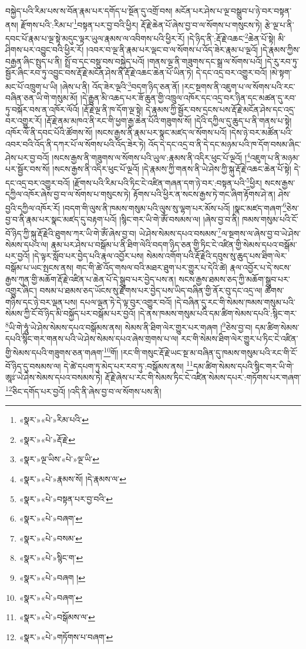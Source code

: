 བསྐྱེད་པའི་རིམ་པས་ས་བོན་རྣམ་པར་དགོད་པ་སྔོན་དུ་འགྲོ་བས། མངོན་པར་ཤེས་པ་ལྔ་བསྒྲུབ་པ་ཉེ་བར་བསྟན་ནས། རྫོགས་པའི་:རིམ་པ་\footnote{«སྣར་»«པེ་»རིམ་པའི་}བསྟན་པར་བྱ་བའི་ཕྱིར། རྡོ་རྗེ་ཆེན་པོ་ཞེས་བྱ་བ་ལ་སོགས་པ་གསུངས་ཏེ། རྩེ་ལྔ་པ་ནི་དབང་པོ་རྣམ་པ་ལྔ་སྟེ་མདུང་ལྟར་ཡུལ་རྣམས་ལ་འབིགས་པའི་ཕྱིར་རོ། །དེ་ཉིད་ནི་:རྡོ་རྗེ་འཆང་\footnote{«སྣར་»«པེ་»རྡོ་རྗེ་}ཆེན་པོ་སྟེ། མི་ཤིགས་པར་འབྱུང་བའི་ཕྱིར་རོ། །འབར་བ་ལྔ་ནི་རྣམ་པར་ལྡང་བ་ལ་སོགས་པ་འོད་ཟེར་རྣམ་པ་ལྔའོ། །དེ་རྣམས་ཀྱིས་བརྒྱན་ཞིང་སྤུད་པ་ནི། སྤྲོ་བ་དང་བསྡུ་བས་བསྐྱེད་པའོ། །གནས་ལྔ་ནི་གཟུགས་དང་སྒྲ་ལ་སོགས་པའོ། །དེ་རུ་རབ་ཏུ་སྦྱོར་ཞིང་རབ་ཏུ་འབྱུང་བས་རྡོ་རྗེ་མངོན་ཤེས་ནི་རྡོ་རྗེ་འཆང་ཆེན་པོ་ཡིན་ཏེ། དེ་དང་འདྲ་བར་འགྱུར་བའོ། །མེ་སྟག་མང་པོ་འཁྲུག་པ་ཡི། །ཞེས་པ་ནི། འོད་ཟེར་ལྔའི་\footnote{«སྣར་»ལྔ་ཡིས་«པེ་»ལྔ་ཡི་}བདག་ཉིད་ཅན་ནོ། །རང་སྔགས་ནི་འཇུག་པ་ལ་སོགས་པའི་རང་བཞིན་ཅན་ཡི་གེ་གསུམ་མོ། །དེ་རྒྱུན་མི་འཆད་པར་ཟོ་ཆུན་གྱི་འཁྲུལ་འཁོར་དང་འདྲ་བར་ཉིན་དང་མཚན་དུ་རབ་ཏུ་བསྐོར་བས་ན་འཁོར་ལོའོ། །རྡོ་རྗེ་ལྔ་ནི་ཁ་དོག་ལྔ་སྟེ། དེ་རྣམས་ཀྱི་སྦྱོར་བས་དྲངས་པས་རྡོ་རྗེ་མངོན་ཤེས་དང་འདྲ་བར་འགྱུར་རོ། །རྡོ་རྗེ་ནམ་མཁའ་ནི་རང་གི་ཕྱག་རྒྱ་ཆེན་པོའི་གཟུགས་སོ། །དེའི་དཀྱིལ་དུ་ཆུད་པ་ནི་གནས་པ་སྟེ། འཁོར་ལོ་ནི་དབང་པོའི་ཚོགས་སོ། །སངས་རྒྱས་ནི་རྣམ་པར་སྣང་མཛད་ལ་སོགས་པའོ། །དེས་ཉེ་བར་མཚོན་པའི་འབར་བའི་འོད་ནི་དཀར་པོ་ལ་སོགས་པའི་འོད་ཟེར་ཏེ། འོད་དེ་དང་འདྲ་བ་ནི་དེ་དང་མཉམ་པའི་ཁ་དོག་བསམ་ཞིང་ཤེས་པར་བྱ་བའོ། །སངས་རྒྱས་ནི་གཟུགས་ལ་སོགས་པའི་ཡུལ་:རྣམས་ནི་འདིར་ཕུང་པོ་ལྔའོ། །\footnote{«སྣར་»«པེ་»རྣམས་སོ། །དེ་རྣམས་ལ་}འཇུག་པ་ནི་མཉམ་པར་སྦྱོར་བས་སོ། །སངས་རྒྱས་ནི་འདིར་ཕུང་པོ་ལྔའོ། །དེ་རྣམས་ཀྱི་གནས་ནི་ཡེ་ཤེས་ཀྱི་སྐུ་རྡོ་རྗེ་འཆང་ཆེན་པོ་སྟེ། དེ་དང་འདྲ་བར་འགྱུར་བའོ། །རྫོགས་པའི་རིམ་པའི་ཏིང་ངེ་འཛིན་གཞན་དག་ཉེ་བར་:བསྟན་པའི་\footnote{«སྣར་»«པེ་»བསྟན་པར་བྱ་བའི་}ཕྱིར། སངས་རྒྱས་དཀྱིལ་འཁོར་ཞེས་བྱ་བ་ལ་སོགས་པ་གསུངས་ཏེ། རྟོགས་པའི་ཕྱིར་ན་སངས་རྒྱས་ཏེ་གང་ཞིག་རྟོགས་ཤེ་ན། ཤེས་བྱའི་དཀྱིལ་འཁོར་རོ། །བདག་གི་ལུས་ནི་ཁམས་གསུམ་པའི་ལུས་སུ་ལྷག་པར་མོས་པའོ། །སྣང་མཛད་གཞག་\footnote{«སྣར་»«པེ་»བཞག་}ཅེས་བྱ་བ་ནི་རྣམ་པར་སྣང་མཛད་དུ་བརྟག་པའོ། །སྙིང་གར་ཡི་གེ་ཨོཾ་བསམས་ལ། །ཞེས་བྱ་བ་ནི། ཁམས་གསུམ་པའི་ངོ་བོ་ཉིད་ཀྱི་སྐུ་རྡོ་རྗེའི་ཐུགས་ཀར་ཡི་གེ་ཨོཾ་ཞེས་བྱ་བ། ཡེ་ཤེས་སེམས་དཔའ་བསམས་\footnote{«སྣར་»«པེ་»བསམ་}ལ་སྔགས་ལ་ཞེས་བྱ་བ་ཡེ་ཤེས་སེམས་དཔའ་ལ། རྣམ་པར་ཤེས་པ་བསྒོམ་པ་ནི་ཐིག་ལེའི་བདག་ཉིད་ཅན་གྱི་ཏིང་ངེ་འཛིན་གྱི་སེམས་དཔའ་བསྒོམ་པར་བྱའོ། །དེ་ལྟར་སློབ་པར་བྱེད་པའི་རྣལ་འབྱོར་པས། སེམས་འགོག་པའི་རྡོ་རྗེའི་དབུས་སུ་ཆུད་པས་ཐིག་ལེར་བསྒོམ་པ་ཡང་སྤངས་ནས། གང་གི་ཚེ་འོད་གསལ་བའི་མཐར་ཐུག་པར་གྱུར་པ་དེའི་ཚེ། རྣལ་འབྱོར་པ་དེ་སངས་རྒྱས་ཀུན་གྱི་མཆོག་རྡོ་རྗེ་འཛིན་པ་ཆེན་པོ་དེ་སྒྲུབ་པར་བྱེད་པས་ན། སངས་རྒྱས་ཐམས་ཅད་ཀྱི་མཆོག་སྒྲུབ་པར་འགྱུར་ཞིང་། བསམ་པ་ཐམས་ཅད་ཡོངས་སུ་རྫོགས་པར་བྱེད་པས་ཡིད་བཞིན་གྱི་ནོར་བུ་དང་འདྲ་ལ། ཚོགས་གཉིས་དང་ཉེ་བར་ལྡན་པས། དཔལ་ལྡན་ཏེ་དེ་ལྟ་བུར་འགྱུར་བའོ། །དེ་བཞིན་དུ་རང་གི་སེམས་ཁམས་གསུམ་པའི་སེམས་ཀྱི་ངོ་བོ་ཉིད་མི་བསྐྱོད་པར་བསྒོམ་པར་བྱའོ། །དེ་ནས་ཁམས་གསུམ་པའི་དམ་ཚིག་སེམས་དཔའི་:སྙིང་གར་\footnote{«སྣར་»«པེ་»སྙིང་ག་}ཡི་གེ་ཧཱུཾ་ཡེ་ཤེས་སེམས་དཔའ་བསྒོམས་ནས། སེམས་ནི་ཐིག་ལེར་གྱུར་པར་གཞག །\footnote{«སྣར་»«པེ་»བཞག །}ཅེས་བྱ་བ། དམ་ཚིག་སེམས་དཔའི་སྙིང་གར་གནས་པའི་ཡེ་ཤེས་སེམས་དཔའ་ཞེས་གྲགས་པ་ལ། རང་གི་སེམས་ཐིག་ལེར་གྱུར་པ་ཏིང་ངེ་འཛིན་གྱི་སེམས་དཔའི་གཟུགས་ཅན་གཞག་\footnote{«སྣར་»«པེ་»བཞག་}གོ། །རང་གི་གསུང་རྡོ་རྗེ་ཡང་སྔ་མ་བཞིན་དུ་ཁམས་གསུམ་པའི་རང་གི་ངོ་བོ་ཉིད་དུ་བསམས་ལ། དེ་ཚེ་དཔག་ཏུ་མེད་པར་རབ་ཏུ་:བསྒོམས་ནས། \footnote{«སྣར་»«པེ་»བསྒོམས་ལ་}དམ་ཚིག་སེམས་དཔའི་སྙིང་གར་ཡི་གེ་ཨཱཿ་ཡེ་ཤེས་སེམས་དཔའ་བསམས་ཏེ། རྡོ་རྗེ་ཞེས་པ་རང་གི་སེམས་ཏིང་ངེ་འཛིན་སེམས་དཔར་:གཏོགས་པར་གཞག་\footnote{«སྣར་»«པེ་»གཏོགས་པ་བཞག་}ཅིང་དགོད་པར་བྱའོ། །འདི་ནི་ཞེས་བྱ་བ་ལ་སོགས་པས་ནི། 